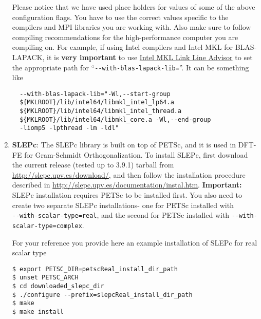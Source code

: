 \begin{enumerate}
Please notice that we have used place holders for values of some of the above configuration flags. You have to use the correct values specific to the compilers and MPI libraries you are working with. Also make sure to follow compiling recommendations for the high-performance computer you are compiling on. For example, if using Intel compilers and Intel MKL for BLAS-LAPACK, it is {\bf very important} to use \href{https://software.intel.com/en-us/articles/intel-mkl-link-line-advisor}{Intel MKL Link Line Advisor} to set the appropriate path for ``\verb|--with-blas-lapack-lib=|''. It can be something like
\begin{verbatim}
  --with-blas-lapack-lib="-Wl,--start-group 
  ${MKLROOT}/lib/intel64/libmkl_intel_lp64.a 
  ${MKLROOT}/lib/intel64/libmkl_intel_thread.a 
  ${MKLROOT}/lib/intel64/libmkl_core.a -Wl,--end-group
  -liomp5 -lpthread -lm -ldl" 
\end{verbatim}

\item {\bf SLEPc}: The SLEPc library is built on top of PETSc, and it is used in DFT-FE for Gram-Schmidt Orthogonalization. To install SLEPc, first download the current release (tested up to 3.9.1) tarball from \url{http://slepc.upv.es/download/}, and then follow the installation procedure described in \url{http://slepc.upv.es/documentation/instal.htm}. {\bf Important: } SLEPc installation requires PETSc to be installed first. You also need to create two separate SLEPc installations- one for PETSc installed with \\\verb|--with-scalar-type=real|, and the second for PETSc installed with \verb|--with-scalar-type=complex|. 
	
For your reference you provide here an example installation of SLEPc for real scalar type
\begin{verbatim}
$ export PETSC_DIR=petscReal_install_dir_path
$ unset PETSC_ARCH
$ cd downloaded_slepc_dir
$ ./configure --prefix=slepcReal_install_dir_path
$ make
$ make install
\end{verbatim}


\end{enumerate}
